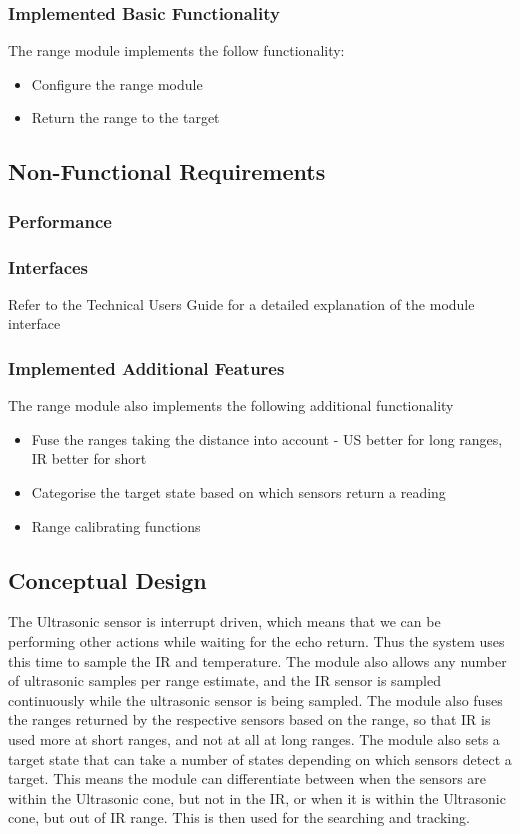 \documentclass[]{report}
\begin{document}
\subsubsection{Implemented Basic Functionality}
The range module implements the follow functionality:
\begin{itemize}
	\item Configure the range module
	\item Return the range to the target
\end{itemize}

\subsection{Non-Functional Requirements}
\subsubsection{Performance}

\subsubsection{Interfaces}
Refer to the Technical Users Guide for a detailed explanation of the module interface

\subsubsection{Implemented Additional Features}
The range module also implements the following additional functionality
\begin{itemize}
	\item Fuse the ranges taking the distance into account - US better for long ranges, IR better for short
	\item Categorise the target state based on which sensors return a reading
	\item Range calibrating functions
\end{itemize}

\subsection{Conceptual Design}
The Ultrasonic sensor is interrupt driven, which means that we can be performing other actions while waiting for the echo return. Thus the system uses this time to sample the IR and temperature. The module also allows any number of ultrasonic samples per range estimate, and the IR sensor is sampled continuously while the ultrasonic sensor is being sampled. The module also fuses the ranges returned by the respective sensors based on the range, so that IR is used more at short ranges, and not at all at long ranges. The module also sets a target state that can take a number of states depending on which sensors detect a target. This means the module can differentiate between when the sensors are within the Ultrasonic cone, but not in the IR, or when it is within the Ultrasonic cone, but out of IR range. This is then used for the searching and tracking. 
\end{document}
